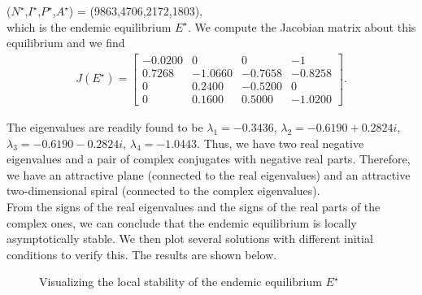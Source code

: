($N^{\star}$,$I^{\star}$,$P^{\star}$,$A^{\star}$) = (9863,4706,2172,1803),\\

which is the endemic equilibrium $E^{\star}$.
We compute the Jacobian matrix about this equilibrium and we find
\begin{align*}
J(E^{\star}) = \begin{bmatrix}
-0.0200 & 0  & 0  & -1 \\
0.7268  & -1.0660 & -0.7658  & -0.8258 \\
0 & 0.2400  & -0.5200 & 0 \\
0  &  0.1600 & 0.5000  & -1.0200
\end{bmatrix}.
\end{align*}

The eigenvalues are readily found to be
$\lambda_{1}=-0.3436$, $\lambda_{2}=-0.6190 + 0.2824i$, $\lambda_{3}=-0.6190 - 0.2824i$, $\lambda_{4} = -1.0443$.
Thus, we have two real negative eigenvalues and a pair of complex conjugates with negative real parts. Therefore, we have an attractive plane (connected to the real eigenvalues) and an attractive two-dimensional spiral (connected to the complex eigenvalues).\\
From the signs of the real eigenvalues and the signs of the real parts of the complex ones, we can conclude that the endemic equilibrium is locally asymptotically stable. We then plot several solutions with different initial conditions to verify this. The results are shown below.

\begin{figure}[H]
	\caption{Visualizing the local stability of the endemic equilibrium $E^{\star}$}
\end{figure}

